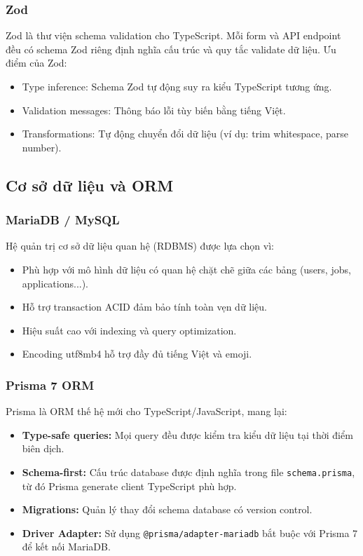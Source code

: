 \subsubsection*{Zod}
Zod là thư viện schema validation cho TypeScript. Mỗi form và API endpoint đều có schema Zod riêng định nghĩa cấu trúc và quy tắc validate dữ liệu. Ưu điểm của Zod:
\begin{itemize}
    \item Type inference: Schema Zod tự động suy ra kiểu TypeScript tương ứng.
    \item Validation messages: Thông báo lỗi tùy biến bằng tiếng Việt.
    \item Transformations: Tự động chuyển đổi dữ liệu (ví dụ: trim whitespace, parse number).
\end{itemize}

\subsection{Cơ sở dữ liệu và ORM}

\subsubsection*{MariaDB / MySQL}
Hệ quản trị cơ sở dữ liệu quan hệ (RDBMS) được lựa chọn vì:
\begin{itemize}
    \item Phù hợp với mô hình dữ liệu có quan hệ chặt chẽ giữa các bảng (users, jobs, applications...).
    \item Hỗ trợ transaction ACID đảm bảo tính toàn vẹn dữ liệu.
    \item Hiệu suất cao với indexing và query optimization.
    \item Encoding utf8mb4 hỗ trợ đầy đủ tiếng Việt và emoji.
\end{itemize}

\subsubsection*{Prisma 7 ORM}
Prisma là ORM thế hệ mới cho TypeScript/JavaScript, mang lại:
\begin{itemize}
    \item \textbf{Type-safe queries:} Mọi query đều được kiểm tra kiểu dữ liệu tại thời điểm biên dịch.
    \item \textbf{Schema-first:} Cấu trúc database được định nghĩa trong file \texttt{schema.prisma}, từ đó Prisma generate client TypeScript phù hợp.
    \item \textbf{Migrations:} Quản lý thay đổi schema database có version control.
    \item \textbf{Driver Adapter:} Sử dụng \texttt{@prisma/adapter-mariadb} bắt buộc với Prisma 7 để kết nối MariaDB.
\end{itemize}

